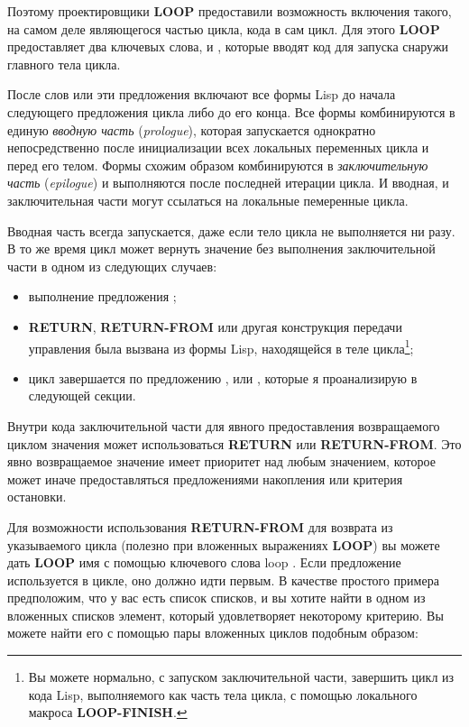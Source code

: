 Поэтому проектировщики \textbf{LOOP} предоставили возможность включения такого, на самом
деле являющегося частью цикла, кода в сам цикл. Для этого \textbf{LOOP} предоставляет два
ключевых слова,  и , которые вводят код для запуска снаружи
главного тела цикла.

После слов  или  эти предложения включают все формы Lisp до
начала следующего предложения цикла либо до его конца. Все формы 
комбинируются в единую \textit{вводную часть} (\textit{prologue}), которая запускается
однократно непосредственно после инициализации всех локальных переменных цикла и перед его
телом. Формы  схожим образом комбинируются в \textit{заключительную часть}
(\textit{epilogue}) и выполняются после последней итерации цикла. И вводная, и
заключительная части могут ссылаться на локальные пемеренные цикла.

Вводная часть всегда запускается, даже если тело цикла не выполняется ни разу. В то же
время цикл может вернуть значение без выполнения заключительной части в одном из следующих
случаев:
\begin{itemize}
\item выполнение предложения ;
\item \textbf{RETURN}, \textbf{RETURN-FROM} или другая конструкция передачи управления
  была вызвана из формы Lisp, находящейся в теле цикла\footnote{Вы можете нормально, с
    запуском заключительной части, завершить цикл из кода Lisp, вы\-пол\-няе\-мо\-го как часть
    тела цикла, с помощью локального макроса \textbf{LOOP-FINISH}.};
\item цикл завершается по предложению ,  или ,
  которые я проанализирую в следующей секции.
\end{itemize}

Внутри кода заключительной части для явного предоставления возвращаемого циклом значения
может использоваться \textbf{RETURN} или \textbf{RETURN-FROM}. Это явно возвращаемое
значение имеет приоритет над любым значением, которое может иначе предоставляться
предложениями накопления или критерия остановки.

Для возможности использования \textbf{RETURN-FROM} для возврата из указываемого цикла
(полезно при вложенных выражениях \textbf{LOOP}) вы можете дать \textbf{LOOP} имя с
помощью ключевого слова loop . Если предложение  используется в
цикле, оно должно идти первым. В качестве простого примера предположим, что у вас есть
список списков, и вы хотите найти в одном из вложенных списков элемент, который
удовлетворяет некоторому критерию. Вы можете найти его с помощью пары вложенных циклов
подобным образом:

